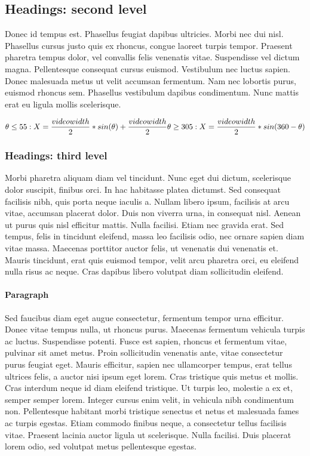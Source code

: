 \documentclass{article}
\begin{document}
\subsection{Headings: second level}
Donec id tempus est. Phasellus feugiat dapibus ultricies. Morbi nec dui nisl. Phasellus cursus justo quis ex rhoncus, congue laoreet turpis tempor. Praesent pharetra tempus dolor, vel convallis felis venenatis vitae. Suspendisse vel dictum magna. Pellentesque consequat cursus euismod. Vestibulum nec luctus sapien. Donec malesuada metus ut velit accumsan fermentum. Nam nec lobortis purus, euismod rhoncus sem. Phasellus vestibulum dapibus condimentum. Nunc mattis erat eu ligula mollis scelerisque. 

\begin{equation} \label{eq1}
  \theta \leq  55:
  X = \frac{video width}{2} * sin(\theta) + \frac{video width}{2}\\
  \\
  \theta \geq 305:
  X = \frac{video width}{2} * sin(360 - \theta)\\
\end{equation}
  

\subsubsection{Headings: third level}
Morbi pharetra aliquam diam vel tincidunt. Nunc eget dui dictum, scelerisque dolor suscipit, finibus orci. In hac habitasse platea dictumst. Sed consequat facilisis nibh, quis porta neque iaculis a. Nullam libero ipsum, facilisis at arcu vitae, accumsan placerat dolor. Duis non viverra urna, in consequat nisl. Aenean ut purus quis nisl efficitur mattis. Nulla facilisi. Etiam nec gravida erat. Sed tempus, felis in tincidunt eleifend, massa leo facilisis odio, nec ornare sapien diam vitae massa. Maecenas porttitor auctor felis, ut venenatis dui venenatis et. Mauris tincidunt, erat quis euismod tempor, velit arcu pharetra orci, eu eleifend nulla risus ac neque. Cras dapibus libero volutpat diam sollicitudin eleifend. 


\paragraph{Paragraph}
Sed faucibus diam eget augue consectetur, fermentum tempor urna efficitur. Donec vitae tempus nulla, ut rhoncus purus. Maecenas fermentum vehicula turpis ac luctus. Suspendisse potenti. Fusce est sapien, rhoncus et fermentum vitae, pulvinar sit amet metus. Proin sollicitudin venenatis ante, vitae consectetur purus feugiat eget. Mauris efficitur, sapien nec ullamcorper tempus, erat tellus ultrices felis, a auctor nisi ipsum eget lorem. Cras tristique quis metus et mollis. Cras interdum neque id diam eleifend tristique. Ut turpis leo, molestie a ex et, semper semper lorem. Integer cursus enim velit, in vehicula nibh condimentum non. Pellentesque habitant morbi tristique senectus et netus et malesuada fames ac turpis egestas. Etiam commodo finibus neque, a consectetur tellus facilisis vitae. Praesent lacinia auctor ligula ut scelerisque. Nulla facilisi. Duis placerat lorem odio, sed volutpat metus pellentesque egestas. 
\end{document}
